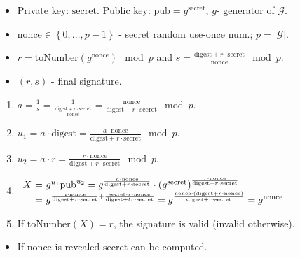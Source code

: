 \begin{frame}
\vskip -0.15cm
\begin{emptyTheorem}
\begin{itemize}
\item Private key: $\mathrm{secret}$. Public key: $\mathrm{pub} = g^{\mathrm{secret}}$, $g$- generator of $\mathcal G$. 
\item $\mathrm{nonce} \in \left\{0,\dots, p-1\right\}$ - secret random use-once num.; $p=|\mathcal G|$.
\item $r = \mathrm{toNumber}\left(g^{\mathrm{nonce}}\right) \mod p$ and  $s = \frac{\mathrm{digest} + r\cdot \mathrm{secret}}{\mathrm{nonce}} \mod p$.
\item $(r,s)$ - final signature.
\end{itemize}
\end{emptyTheorem}
\vskip -0.15cm
\begin{emptyTheorem}
\begin{enumerate}
\item $a = \frac{1}{s} = \frac{1}{\frac{\mathrm{digest} + r\cdot \mathrm{secret}}{\mathrm{nonce}}} = \frac{\mathrm{nonce}}{\mathrm{digest}+ r\cdot \mathrm{secret}} \mod p$.
\item $u_1 = a\cdot \mathrm{digest} = \frac{a\cdot \mathrm{nonce}}{\mathrm{digest} + r\cdot \mathrm{secret}} \mod p$.
\item $u_2 = a \cdot r = \frac{ r\cdot \mathrm{nonce}}{\mathrm{digest} + r\cdot \mathrm{secret}} \mod p$.
\item $
\begin{array}{r@{~}c@{~}l}
X &=&g^{u_1} \mathrm{pub}^{u_2} = g^{\frac{a\cdot \mathrm{nonce}}{\mathrm{digest}+ r\cdot \mathrm{secret}}} \cdot \left(g^{\mathrm{secret}}\right)^{ \frac{ r\cdot \mathrm{nonce}}{\mathrm{digest} + r\cdot \mathrm{secret}}} \\
&=& g^{\frac{a\cdot \mathrm{nonce}}{\mathrm{digest}+ r\cdot \mathrm{secret}} +  \frac{ \mathrm{secret}\cdot r\cdot \mathrm{nonce}}{\mathrm{digest} + t r\cdot \mathrm{secret}}} = g^{\frac{\mathrm{nonce}\cdot(\mathrm{digest} + r\cdot \mathrm{nonce}) }{\mathrm{digest} +  r\cdot \mathrm{secret}}} = g^{\mathrm{nonce}}
\end{array}
$
\item If $\mathrm{toNumber} \left(X\right) = r$, the signature is valid (invalid otherwise).
\end{enumerate}
\end{emptyTheorem}
\begin{itemize}
\item If $\mathrm{nonce}$ is revealed $\mathrm{secret}$ can be computed.
\end{itemize}
\end{frame}